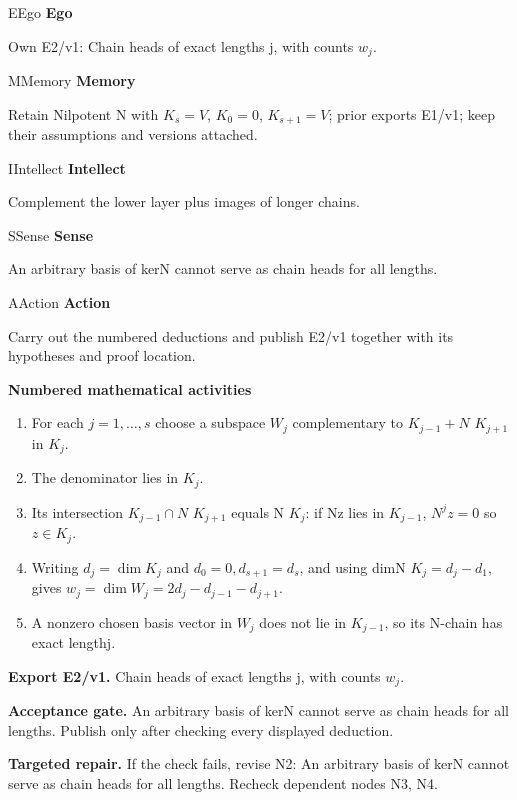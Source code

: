 \documentclass[preprint,12pt,aps,pra,showkeys,amsmath,amssymb,superscriptaddress,floatfix]{revtex4-2}
\theoremstyle{definition}
\theoremstyle{remark}
\newcommand{\mmfaculty}[3]{%
 \begin{mmfacultybox}{#1}{#2}
 {\sffamily\bfseries\color{MMBlue}#2}\par\smallskip #3
 \end{mmfacultybox}}
\newcommand{\field}[2]{\par\smallskip\noindent\textbf{#1.} #2\par}
\begin{document}
\mmfaculty{E}{Ego}{Own E2/v1: Chain heads of exact lengths j, with counts \(w_j\).}

\mmfaculty{M}{Memory}{Retain Nilpotent N with \(K_s=V\), \(K_{0}=0\), \(K_{s+1}=V\); prior
exports E1/v1; keep their assumptions and versions attached.}

\mmfaculty{I}{Intellect}{Complement the lower layer plus images of longer chains.}

\mmfaculty{S}{Sense}{An arbitrary basis of kerN cannot serve as chain heads for all lengths.}

\mmfaculty{A}{Action}{Carry out the numbered deductions and publish E2/v1 together with its
hypotheses and proof location.}

\smallskip\noindent\textbf{Numbered mathematical activities}

\begin{enumerate}[label=N2.\arabic*,leftmargin=3.4em]

\item For each \(j=1,\ldots ,s\) choose a subspace \(W_j\) complementary to
\(K_{j-1}+N\) \(K_{j+1}\) in \(K_j\).

\item The denominator lies in \(K_j\).

\item Its intersection \(K_{j-1}\cap N\) \(K_{j+1}\) equals N \(K_j\): if Nz
lies in \(K_{j-1}\), \(N^jz=0\) so \(z\in K_j\).

\item Writing \(d_j=\operatorname{dim} K_j\) and \(d_{0}=0,d_{s+1}=d_s\), and
using dimN \(K_j=d_j-d_{1}\), gives
\(w_j=\operatorname{dim} W_j=2d_j-d_{j-1}-d_{j+1}\).

\item A nonzero chosen basis vector in \(W_j\) does not lie in \(K_{j-1}\), so
its N-chain has exact lengthj.

\end{enumerate}

\field{Export E2/v1}{Chain heads of exact lengths j, with counts \(w_j\).}

\field{Acceptance gate}{An arbitrary basis of kerN cannot serve as chain heads for all lengths.
Publish only after checking every displayed deduction.}

\field{Targeted repair}{If the check fails, revise N2: An arbitrary basis of kerN cannot serve
as chain heads for all lengths. Recheck dependent nodes N3, N4.}

\clearpage
\end{document}
